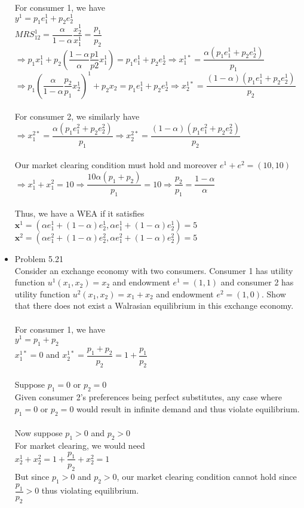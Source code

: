 \documentclass{article}
\begin{document}
\begin{itemize}
    For consumer 1, we have\\
    $y^1=p_1e_1^1+p_2e_2^1$\\
    $MRS_{12}^1=\dfrac{\alpha}{1-\alpha}\dfrac{x_2^1}{x_1^1}=\dfrac{p_1}{p_2}$\\
    $\Rightarrow p_1x_1^1+p_2(\dfrac{1-\alpha}{\alpha}\dfrac{p1}{p2}x_1^1)=p_1e_1^1+p_2e_2^1\Rightarrow x_1^{1*}=\dfrac{\alpha(p_1e_1^1+p_2e_2^1)}{p_1}$\\
    $\Rightarrow p_1(\dfrac{\alpha}{1-\alpha}\dfrac{p_2}{p_1}x_2^1)^1+p_2x_2=p_1e_1^1+p_2e_2^1\Rightarrow x_2^{1*}=\dfrac{(1-\alpha)(p_1e_1^1+p_2e_2^1)}{p_2}$\\\\
    For consumer 2, we similarly have\\
    $\Rightarrow x_1^{2*}=\dfrac{\alpha(p_1e_1^2+p_2e_2^2)}{p_1}\Rightarrow x_2^{2*}=\dfrac{(1-\alpha)(p_1e_1^2+p_2e_2^2)}{p_2}$\\\\
    Our market clearing condition must hold and moreover $e^1+e^2=(10,10)$\\
    $\Rightarrow x_1^1+x_1^2=10\Rightarrow\dfrac{10\alpha(p_1+p_2)}{p_1}=10\Rightarrow\dfrac{p_2}{p_1}=\dfrac{1-\alpha}{\alpha}$\\\\
    Thus, we have a WEA if it satisfies\\
    $\textbf{x}^1=(\alpha e_1^1+(1-\alpha)e_2^1,\alpha e_1^1+(1-\alpha)e_2^1)=5$\\
    $\textbf{x}^2=(\alpha e_1^2+(1-\alpha)e_2^2,\alpha e_1^2+(1-\alpha)e_2^2)=5$
    \pagebreak
    \item Problem 5.21\\
    Consider an exchange economy with two consumers.  Consumer 1 has utility function $u^1(x_1,x_2)=x_2$ and endowment $e^1=(1,1)$ and consumer 2 has utility function $u^2(x_1,x_2)=x_1+x_2$ and endowment $e^2=(1,0)$.  Show that there does not exist a Walrasian equilibrium in this exchange economy.\\\\
    For consumer 1, we have\\
    $y^1=p_1+p_2$\\
    $x_1^{1*}=0$ and $x_2^{1*}=\dfrac{p_1+p_2}{p_2}=1+\dfrac{p_1}{p_2}$\\\\
    Suppose $p_1=0$ or $p_2=0$\\
    Given consumer 2's preferences being perfect substitutes, any case where $p_1=0$ or $p_2=0$ would result in infinite demand and thus violate equilibrium.\\\\
    Now suppose $p_1>0$ and $p_2>0$\\
    For market clearing, we would need\\
    $x_2^1+x_2^2=1+\dfrac{p_1}{p_2}+x_2^2=1$\\
    But since $p_1>0$ and $p_2>0$, our market clearing condition cannot hold since $\dfrac{p_1}{p_2}>0$ thus violating equilibrium.
\end{itemize}
\end{document}
